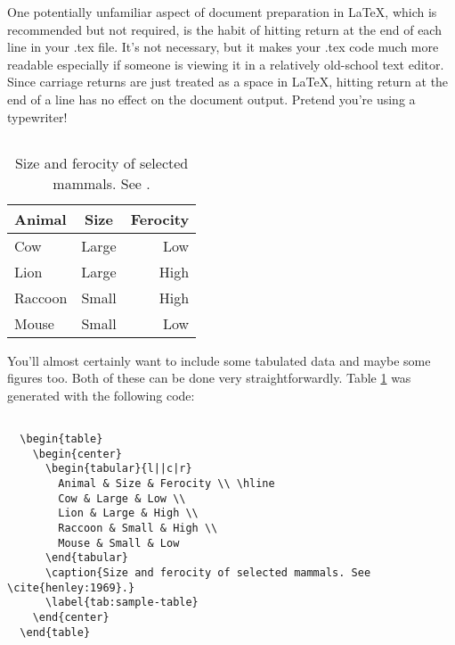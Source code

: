One potentially unfamiliar aspect of document preparation in \LaTeX, 
which is recommended but not required, is the habit of hitting return at the
end of each line in your .tex file. It's not necessary, but it makes your
.tex code much more readable especially if someone is viewing it in a 
relatively old-school text editor. Since carriage returns are just treated as
a space in \LaTeX, hitting return at the end of a line has no effect on the
document output. Pretend you're using a typewriter!

\subsection{}

\begin{table}
  \begin{center}
    \begin{tabular}{l||c|r}
      Animal & Size & Ferocity \\ \hline
      Cow & Large & Low \\
      Lion & Large & High \\
      Raccoon & Small & High \\
      Mouse & Small & Low
    \end{tabular}
    \caption{Size and ferocity of selected mammals. See \cite{henley:1969}.}
    \label{tab:sample-table}
  \end{center}
\end{table}

   

You'll almost certainly want to include some tabulated data and maybe some
figures too. Both of these can be done very straightforwardly. Table
\ref{tab:sample-table} was generated with the following code:

\pagebreak

\begin{verbatim}

  \begin{table}
    \begin{center}
      \begin{tabular}{l||c|r}
        Animal & Size & Ferocity \\ \hline
        Cow & Large & Low \\
        Lion & Large & High \\
        Raccoon & Small & High \\
        Mouse & Small & Low
      \end{tabular}
      \caption{Size and ferocity of selected mammals. See \cite{henley:1969}.}
      \label{tab:sample-table}
    \end{center}
  \end{table}

\end{verbatim}


